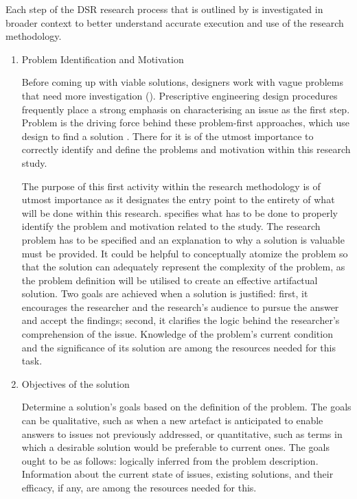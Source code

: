 \par{Each step of the DSR research process that is outlined by \cite{peffers2007design} is investigated in broader context to better understand accurate execution and use of the research methodology.}
\par{\begin{enumerate}
        \item Problem Identification and Motivation
\par{Before coming up with viable solutions, designers work with vague problems that need more investigation (\citealt{buchanan1992wicked, rittel1973dilemmas}). Prescriptive engineering design procedures frequently place a strong emphasis on characterising an issue as the first step. Problem  is the driving force behind these problem-first approaches, which use design to find a solution \citep{dewey2022we}. There for it is of the utmost importance to correctly identify and define the problems and motivation within this research study.}
\par{The purpose of this first activity within the research methodology is of utmost importance as it designates the entry point to the entirety of what will be done within this research. \cite{peffers2007design} specifies what has to be done to properly identify the problem and motivation related to the study. The research problem has to be specified and an explanation to why a solution is valuable must be provided. It could be helpful to conceptually atomize the problem so that the solution can adequately represent the complexity of the problem, as the problem definition will be utilised to create an effective artifactual solution. Two goals are achieved when a solution is justified: first, it encourages the researcher and the research's audience to pursue the answer and accept the findings; second, it clarifies the logic behind the researcher's comprehension of the issue. Knowledge of the problem's current condition and the significance of its solution are among the resources needed for this task.}
        \item Objectives of the solution
\par{Determine a solution's goals based on the definition of the problem. The goals can be qualitative, such as when a new artefact is anticipated to enable answers to issues not previously addressed, or quantitative, such as terms in which a desirable solution would be preferable to current ones. The goals ought to be as follows: logically inferred from the problem description. Information about the current state of issues, existing solutions, and their efficacy, if any, are among the resources needed for this.}

\end{enumerate}}
